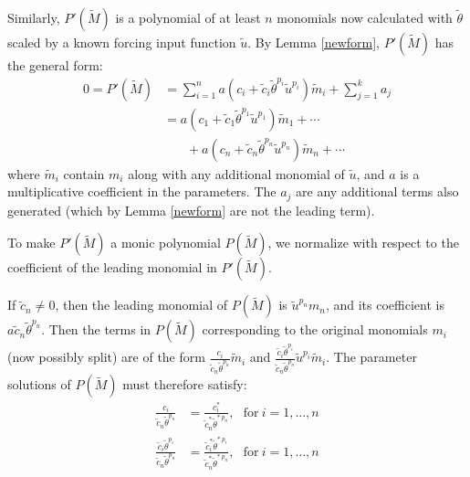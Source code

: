 \documentclass[a4paper,fleqn]{cas-dc}
\theoremstyle{definition}
\begin{document}
\begin{pf}
    Similarly, $P'(\tilde{M})$ is a polynomial of at least $n$ monomials now calculated with $\tilde{\theta}$ scaled by a known forcing input function $\tilde{u}$. 
    By Lemma \ref{newform}, $P'(\tilde{M})$ has the general form: 
     \begin{align*}
        0 = P'(\tilde{M}) & =  \sum_{i = 1}^{n} a(c_i + \tilde{c}_i \tilde{\theta}^{p_i}\tilde{u}^{p_i} )  \tilde{m}_i + \sum_{j = 1}^{k} a_j \\
        & =  a(c_1 + \tilde{c}_1 \tilde{\theta}^{p_1} \tilde{u}^{p_1}) \tilde{m}_1 + \cdots \\
        & ~~~~~~~~+ a(c_{n} + \tilde{c}_{n} \tilde{\theta}^{p_{n}}\tilde{u}^{p_{n}}) \tilde{m}_{n} + \cdots
    \end{align*}
    where $\tilde{m}_i$ contain $m_i$ along with any additional monomial of $\tilde{u}$, and $a$ is a multiplicative coefficient in the parameters. The $a_j$ are any additional terms also generated (which by Lemma \ref{newform} are not the leading term).
    
    To make $P'(\tilde{M})$ a monic polynomial $P(\tilde{M})$, we normalize with respect to the coefficient of the leading monomial in $P'(\tilde{M})$. 
    
    If $\tilde{c}_n \neq 0$, then the leading monomial of $P(\tilde{M})$ is $\tilde{u}^{p_n}m_n$, and its coefficient is $a\tilde{c}_n \tilde{\theta}^{p_n}$.
    Then the terms in $P(\tilde{M})$ corresponding to the original monomials $m_i$ (now possibly split) are of the form $\frac{c_i}{\tilde{c}_n \tilde{\theta}^{p_n}} \tilde{m}_i$ and $\frac{\tilde{c}_i \tilde{\theta}^{p_i}}{\tilde{c}_n \tilde{\theta}^{p_n}} \tilde{u}^{p_i} \tilde{m}_i$.
    The parameter solutions of $P(\tilde{M})$ must therefore satisfy:
    \begin{align}
        \frac{c_i}{\tilde{c}_n \tilde{\theta}^{p_n}} & = \frac{c^*_i}{\tilde{c}_n^* \tilde{\theta}^{*~p_n}}, ~~~\text{for}~i=1,...,n \label{pnewsoln_thm1} \\
        \frac{\tilde{c}_i \tilde{\theta}^{p_i}}{\tilde{c}_n \tilde{\theta}^{p_n}} & = \frac{\tilde{c}^*_i \tilde{\theta}^{*~p_i}}{\tilde{c}_n^* \tilde{\theta}^{*~p_n}}, ~~~\text{for}~i=1,...,n \label{pnewsolnB_thm1} 
    \end{align} 
   

\end{pf}
\end{document}
